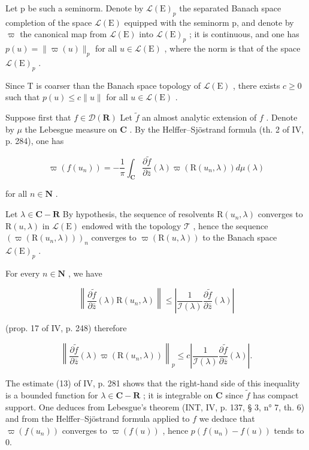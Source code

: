 Let p be such a seminorm. Denote by \(\mathcal{L}(\mathrm{E})_{p}\) the separated Banach space completion of the space \(\mathcal{L}(\mathrm{E})\) equipped with the seminorm p, and denote by \(\varpi\) the canonical map from \(\mathcal{L}(\mathrm{E})\) into \(\mathcal{L}(\mathrm{E})_{p}\) ; it is continuous, and one has \(p(u) = \|\varpi(u)\|_{p}\) for all \(u \in \mathcal{L}(\mathrm{E})\) , where the norm is that of the space \(\mathcal{L}(\mathrm{E})_{p}\) .

Since T is coarser than the Banach space topology of \(\mathcal{L}(\mathrm{E})\) , there exists \(c \geqslant 0\) such that \(p(u) \leqslant c \|u\|\) for all \(u \in \mathcal{L}(\mathrm{E})\) .

Suppose first that \(f \in \mathcal{D}(\mathbf{R})\) Let \(\tilde{f}\) an almost analytic extension of \(f\) . Denote by \(\mu\) the Lebesgue measure on \(\mathbf{C}\) . By the Helffer--Sjöstrand formula (th. 2 of IV, p. 284), one has

\[
\varpi (f (u _ {n})) = - \frac {1}{\pi} \int_ {\mathbf {C}} \frac {\partial \widetilde {f}}{\partial \bar {z}} (\lambda) \varpi (\mathrm{R} (u _ {n}, \lambda)) d \mu (\lambda)\tag{14}
\]

for all \(n \in \mathbf{N}\) .

Let \(\lambda \in \mathbf{C} - \mathbf{R}\) By hypothesis, the sequence of resolvents \(\mathrm{R}(u_n,\lambda)\) converges to \(\mathrm{R}(u,\lambda)\) in \(\mathcal{L}(\mathrm{E})\) endowed with the topology \(\mathcal{T}\) , hence the sequence \((\varpi (\mathrm{R}(u_n,\lambda)))_n\) converges to \(\varpi (\mathrm{R}(u,\lambda))\) to the Banach space \(\mathcal{L}(\mathrm{E})_p\) .

For every \(n \in \mathbf{N}\) , we have

\[
\left\| \frac {\partial \widetilde {f}}{\partial \bar {z}} (\lambda) \mathrm{R} (u _ {n}, \lambda) \right\| \leqslant \left| \frac {1}{\mathcal{I} (\lambda)} \frac {\partial \widetilde {f}}{\partial \bar {z}} (\lambda) \right|
\]

(prop. 17 of IV, p. 248) therefore

\[
\left\| \frac {\partial \widetilde {f}}{\partial \overline {{z}}} (\lambda) \varpi (\mathrm{R} (u _ {n}, \lambda)) \right\| _ {p} \leqslant c \left| \frac {1}{\mathcal {I} (\lambda)} \frac {\partial \widetilde {f}}{\partial \overline {{z}}} (\lambda) \right|.
\]

The estimate (13) of IV, p. 281 shows that the right-hand side of this inequality is a bounded function for \(\lambda \in \mathbf{C} - \mathbf{R}\) ; it is integrable on \(\mathbf{C}\) since \(\widetilde{f}\) has compact support. One deduces from Lebesgue's theorem (INT, IV, p. 137, § 3, n° 7, th. 6) and from the Helffer--Sjöstrand formula applied to \(f\) we deduce that \(\varpi(f(u_n))\) converges to \(\varpi(f(u))\) , hence \(p(f(u_n) - f(u))\) tends to 0.

